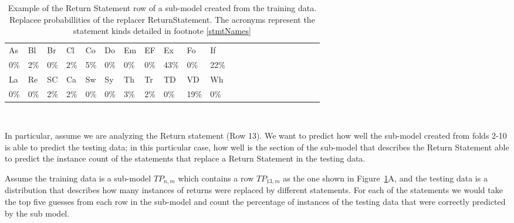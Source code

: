\documentclass[conference]{IEEEtran}
\begin{document}
\begin{table}[ht]
\begin{tabular}{llllllllllllllllllllll}
\hline
As & Bl & Br & Cl & Co & Do & Em & EF & Ex & Fo & If \\
0\%&2\%&0\%&2\%&5\%&0\%&0\%&0\%&43\%&0\%&22\% \\
\hline 
La & Re & SC & Ca & Sw & Sy & Th & Tr & TD & VD & Wh \\
0\%&0\%&2\%&2\%&0\%&0\%&3\%&2\%&0\%&19\%&0\% \\
\hline
\end{tabular}
\\
\caption{Example of the Return Statement row of a sub-model created from 
the training data. Replacee probabillities of the replacer ReturnStatement. The acronyms represent the statement kinds detailed in footnote \ref{stmtNames}}
 \label{fig:exPredReturn} 
\end{table} 

% 


In 
particular, assume we are analyzing the Return statement (Row 13). We want to 
predict 
how well the sub-model created from folds 2-10 is able to predict the testing 
data; in this particular case, how well is the section of the sub-model that 
describes the Return Statement able to predict the instance count of the 
statements that replace a Return Statement in the testing data.

Assume the training data is a sub-model $TP_{n,m}$ which contains a row 
$TP_{13,m}$ as the one shown in Figure~\ref{fig:exPredReturn}A, and the testing data is a distribution that describes 
how many instances of returns were replaced by different statements.
For each of the statements we would take the top five guesses from each row in 
the sub-model and count the percentage of instances of the testing data that were correctly 
predicted by the sub model. 
\end{document}
